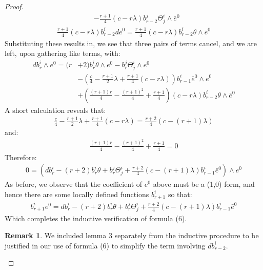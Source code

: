 \documentclass[11pt]{amsart}
\theoremstyle{definition}
\newtheorem{remark}{Remark}
\theoremstyle{definition}
\begin{document}
\begin{proof}
\begin{align*}
&- \frac{r+1}{4} (c - r \lambda) b^j_{r-2} \Theta^i_j \wedge \bar{e}^0
\end{align*}
%
\begin{align*}
\frac{r+1}{4} (c - r \lambda) b^i_{r-2} d \bar{e}^0 = \frac{r+1}{4} (c - r \lambda) b^i_{r-2} \theta \wedge \bar{e}^0
\end{align*}
%
Substituting these results in, we see that three pairs of terms cancel, and we are left, upon gathering like terms, with:
%
\begin{align*}
d b^i_r \wedge e^0 = (r &+ 2) b^i_r \theta \wedge e^0 - b^j_r \Theta^i_j \wedge e^0 \\
&- \left( \frac{c}{4} - \frac{r+1}{2} \lambda + \frac{r+1}{4} (c - r \lambda) \right) b^i_{r-1} \bar{e}^0 \wedge e^0 \\
&+ \left( \frac{ (r+1)r }{4} - \frac{ (r+1)^2 }{4} + \frac{r+1}{4} \right) (c - r \lambda) b^i_{r-2} \theta \wedge \bar{e}^0
\end{align*}
%
A short calculation reveals that:
%
\begin{align*}
\frac{c}{4} - \frac{r+1}{2} \lambda + \frac{r+1}{4} (c - r \lambda) = \frac{r+2}{4}(c - (r+1) \lambda)
\end{align*}
%
and:
%
\begin{align*}
\frac{ (r+1)r }{4} - \frac{ (r+1)^2 }{4} + \frac{r+1}{4} = 0
\end{align*}
%
Therefore:
%
\begin{align*}
0 = \left( d b^i_r - (r + 2) b^i_r \theta + b^j_r \Theta^i_j +  \frac{r+2}{4}(c - (r+1) \lambda ) b^i_{r-1} \bar{e}^0 \right) \wedge e^0
\end{align*}
%
As before, we observe that the coefficient of $e^0$ above must be a (1,0) form, and hence there are some locally defined functions $b^i_{r+1}$ so that:
%
\begin{align*}
b^i_{r+1} e^0 = d b^i_r - (r + 2) b^i_r \theta + b^j_r \Theta^i_j +  \frac{r+2}{4}(c - (r+1) \lambda ) b^i_{r-1} \bar{e}^0
\end{align*}
%
Which completes the inductive verification of formula (6).

\begin{remark}  We included lemma 3 separately from the inductive procedure to be justified in our use of formula (6) to simplify the term involving $d b^i_{r-2}$.
\end{remark}
%
\bigskip


\end{proof}
\end{document}
